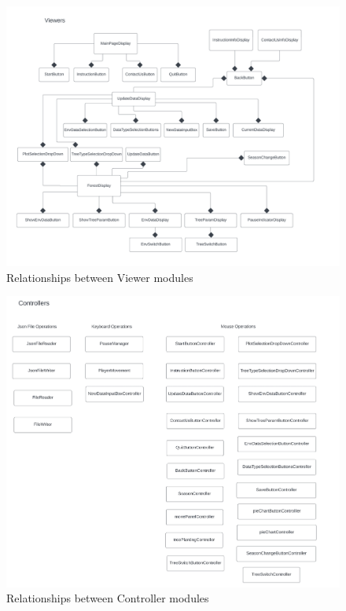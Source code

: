 \documentclass[12pt, titlepage]{article}
\begin{document}
\begin{figure}[H]
\caption{Relationships between Viewer modules}
\includegraphics[scale=0.65]{SysDesPic/Viewer-Modules.png}
\end{figure}

\newpage

\begin{figure}[H]
\caption{Relationships between Controller modules}
\includegraphics[scale=0.65]{SysDesPic/Controller-Modules.png}
\end{figure}
\end{document}
